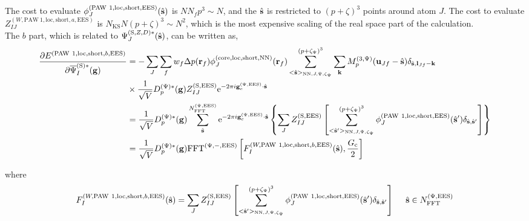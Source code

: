 \documentclass[paper=a4, fontsize=11pt]{article} %
\numberwithin{equation}{section} %
\numberwithin{figure}{section} %
\numberwithin{table}{section} %
\newcommand{\p}{\partial}
\newcommand{\bu}{{\bf{u}}}
\newcommand{\bl}{{\bf{l}}}
\newcommand{\bk}{{\bf{k}}}
\newcommand{\bs}{{\bf{s}}}
\newcommand{\bg}{{\bf{g}}}
\newcommand{\br}{{\bf{r}}}
\newcommand{\hs}{{\hat{\bf{s}}}}
\newcommand{\rS}{{\mathrm{S}}}
\newcommand{\rEES}{{\mathrm{EES}}}
\newcommand{\rcore}{{\mathrm{core}}}
\newcommand{\rNN}{{\mathrm{NN}}}
\newcommand{\re}{{\mathrm{e}}}
\newcommand{\rshort}{{\mathrm{short}}}
\newcommand{\rP}{{\mathrm{PAW}}}
\newcommand{\rlo}{{\mathrm{loc}}}
\newcommand{\gcpEES}{{\bg_c^{(\Psi,\rEES)}}}
\newcommand{\igcps}{2\pi i\gcpEES\cdot\hat \bs}
\newcommand{\psigsc}{{\overline \Psi_I^{(\rS)*}(\bg)}}
\newcommand{\NKS}{{N_{\mathrm{KS}}}}
\newcommand{\NFFTpEES}{{N^{\mathrm{(\Psi,\rEES})}_{\mathrm{FFT}}}}
\newcommand{\hGc}{{\frac{G_{\mathrm{c}}}{2}}}
\newcommand{\Dpgc}{{D^{(\Psi)*}_p(\bg)}}
\newcommand{\Mp}{{M_p^{(3,\Psi)}}}
\newcommand{\FFTpiEES}{{\mathrm{FFT}^{(\Psi,-,\rEES)}}}
\newcommand{\pzp}{{(p+\zeta_{\Psi})^3}}
\newcommand{\hsJp}{{<\hs>_{\rNN,J,\Psi,\zeta_\Psi}}}
\newcommand{\hspJp}{{<\hs'>_{\rNN,J,\Psi,\zeta_\Psi}}}
\newcommand{\hsinpEES}{{\ \ \ \ \hs \in \NFFTpEES}}
\begin{document}
The cost to evaluate $\phi_J^{(\rP\ 1,\rlo,\rshort,\rEES)}(\hs)$ is $NN_f p^3 \sim N$, and the $\hat \bs$ is restricted to $(p+\zeta)^3$ points around atom $J$. The cost to evaluate $Z_{IJ}^{(W,\rP\ 1,\rlo,\rshort,a,\rEES)}$ is $\NKS N (p+\zeta)^3 \sim N^2$, which is the most expensive scaling of the real space part of the calculation.\\

The $b$ part, which is related to $\Psi_J^{(\rS,Z,D)*}(\hat \bs)$, can be written as,
\begin{equation}
\begin{split}
\frac{\p E^{(\rP\ 1,\rlo,\rshort,b,\rEES)}}{\p \psigsc}
&= - \sum_J \sum_f w_f \Delta p(\br_f) \phi_J^{(\rcore,\rlo,\rshort,\rNN)}(\br_f)\sum_{\hsJp}^\pzp \sum_{\bk} \Mp(\bu_{Jf}-\hat \bs)\delta_{\hat \bs,\bl_{Jf}-\bk} \\
& \times \frac{1}{\sqrt V} \Dpgc  Z_{IJ}^{(\rS,\rEES)}  \re^{-\igcps} \\
&= \frac{1}{\sqrt V} \Dpgc \sum_{\hs}^\NFFTpEES \re^{-\igcps} \left\{\sum_J Z_{IJ}^{(\rS,\rEES)}\left[\sum_{\hspJp}^\pzp \phi_J^{(\rP\ 1,\rlo,\rshort,\rEES)}(\hs') \delta_{\hs,\hs'}\right]\right\}\\
&= \frac{1}{\sqrt V} \Dpgc \FFTpiEES \left[F_I^{(W,\rP\ 1,\rlo,\rshort,b,\rEES)}(\hs),\hGc\right]\\
\end{split}
\end{equation}

where 
\begin{equation}
\begin{split}
F_I^{(W,\rP\ 1,\rlo,\rshort,b,\rEES)}(\hs)&= \sum_J Z_{IJ}^{(\rS,\rEES)}\left[\sum_{\hspJp}^\pzp \phi_J^{(\rP\ 1,\rlo,\rshort,\rEES)}(\hs') \delta_{\hs,\hs'}\right]\hsinpEES\\
\end{split}
\end{equation}
\end{document}
